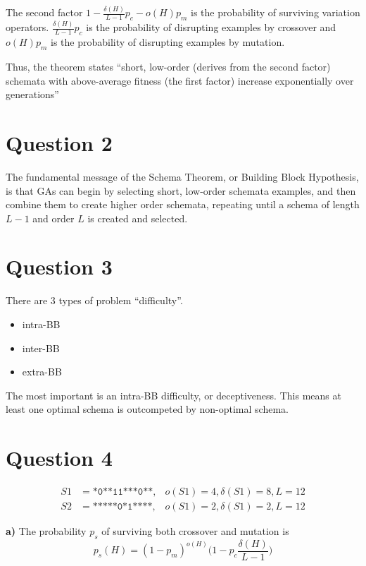 \documentclass[12pt, a4paper]{article}
\begin{document}
        The second factor $1 - \frac{\delta(H)}{L - 1} p_c - o(H) p_m$ is the
        probability of surviving variation operators. $\frac{\delta(H)}{L - 1} p_c$
        is the probability of disrupting examples by crossover and $o(H) p_m$ is the
        probability of disrupting examples by mutation.

        Thus, the theorem states ``short, low-order (derives from the second factor)
        schemata with above-average fitness (the first factor) increase exponentially
        over generations''

    \section{Question 2}
        The fundamental message of the Schema Theorem, or Building Block Hypothesis,
        is that GAs can begin by selecting short, low-order schemata examples, and
        then combine them to create higher order schemata, repeating until a schema
        of length $L-1$ and order $L$ is created and selected.

    \section{Question 3}
        There are 3 types of problem ``difficulty''.
        \begin{itemize}
            \item intra-BB
            \item inter-BB
            \item extra-BB
        \end{itemize}
        The most important is an intra-BB difficulty, or deceptiveness. This means
        at least one optimal schema is outcompeted by non-optimal schema.

    \section{Question 4}
        \begin{align*}
            S1 &= \texttt{*0**11***0**}, & o(S1) = 4, \delta(S1) = 8, L = 12\\
            S2 &= \texttt{*****0*1****}, & o(S1) = 2, \delta(S1) = 2, L = 12
        \end{align*}

        {\bf a)} The probability $p_s$ of surviving both crossover and mutation is
        $$p_s(H) = (1 - p_m)^{o(H)}\Big(1 - p_c \frac{\delta(H)}{L - 1}\Big)$$
\end{document}
